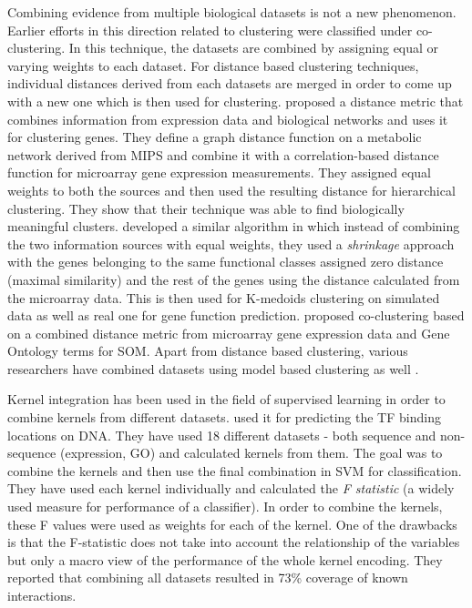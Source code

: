 Combining evidence from multiple biological datasets is not a new phenomenon. Earlier efforts in this direction 
related to clustering were classified under co-clustering. In this technique, the datasets are combined by assigning equal 
or varying weights to each dataset. For distance based clustering techniques, individual distances derived from each datasets 
are merged in order to come up with a new one which is then used for clustering. \citet{Hanisch2002Coclustering} 
proposed a distance metric that combines information from expression data and biological networks and uses it for clustering 
genes. They define a graph distance function on a metabolic network derived from MIPS \citep{Gueldener2006MPact} 
and combine it with a correlation-based distance function for microarray gene expression measurements. They assigned 
equal weights to both the sources and then used the resulting distance for hierarchical clustering. They show that their technique was 
able to find biologically meaningful clusters. \citet{huang2006incorporating} developed a similar algorithm in which 
instead of combining the two information sources with equal weights, they used a \textit{shrinkage} approach with the 
genes belonging to the same functional classes assigned zero distance (maximal similarity) and the rest of the genes using the distance 
calculated from the microarray data. This is then used for K-medoids clustering on simulated data as well as real one for gene function 
prediction. \citet{bramier2007coclustering} proposed co-clustering based on a combined distance metric from microarray 
gene expression data and Gene Ontology terms for \ac{SOM}. Apart from distance based clustering, various researchers have combined datasets 
using model based clustering as well \citep{pan06incorporating}.

Kernel integration has been used in the field of supervised learning in order to combine kernels from different datasets. 
\citet{Holloway2006MachineLearning} used it for predicting the TF binding locations on DNA. They have used 18 different 
datasets - both sequence and non-sequence (expression, GO) and calculated kernels from them. The goal was to combine the kernels and then 
use the final combination in \ac{SVM} for classification. They have used each kernel individually and calculated the \textit{F statistic} 
(a widely used measure for performance of a classifier). In order to combine the kernels, these F values were used as weights 
for each of the kernel. One of the drawbacks is that the F-statistic does not take into account the relationship of the variables but 
only a macro view of the performance of the whole kernel encoding. They reported that combining all datasets resulted in 73\% coverage 
of known interactions. 

